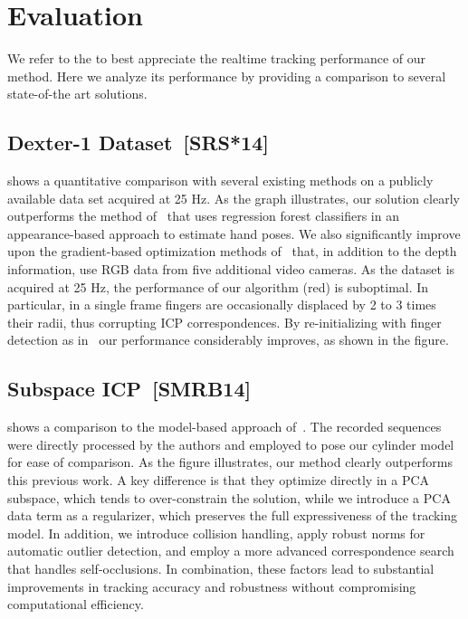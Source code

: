 

\section{Evaluation}
\label{sec:eval}

We refer to the \VideoHtrackAnimation to best appreciate the realtime tracking performance of our method. Here we analyze its performance by providing a comparison to several state-of-the art solutions.

\subsection*{Dexter-1 Dataset~[SRS*14]}
 shows a quantitative comparison with several existing methods on a publicly available data set acquired at 25 Hz. As the graph illustrates, our solution clearly outperforms the method of~\cite{tang_cvpr14} that uses regression forest classifiers in an appearance-based approach to estimate hand poses. We also significantly improve upon the gradient-based optimization methods of~\cite{sridhar2013multicam,sridhar2014anisotropic} that, in addition to the depth information, use RGB data from five additional video cameras.
% 
As the dataset is acquired at 25 Hz, the performance of our algorithm (red) is suboptimal. In particular, in a single frame fingers are occasionally displaced by 2 to 3 times their radii, thus corrupting ICP correspondences. By re-initializing with finger detection as in~\protect\cite{qian2014realtime} our performance considerably improves, as shown in the figure.


\subsection*{Subspace ICP~[SMRB14]}
 shows a comparison to the model-based approach of~\cite{schroder2014real}. The recorded sequences were directly processed by the authors and employed to pose our cylinder model for ease of comparison.  As the figure illustrates, our method clearly outperforms this previous work.
A key difference is that they optimize directly in a PCA subspace, which tends to over-constrain the solution, while we introduce a PCA data term as a regularizer, which preserves the full expressiveness of the tracking model.
In addition, we introduce collision handling, apply robust norms for automatic outlier detection, and
employ a more advanced correspondence search that handles self-occlusions.
In combination, these factors lead to substantial improvements in tracking accuracy and robustness without compromising computational efficiency.

